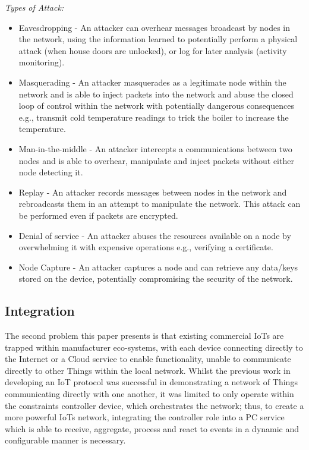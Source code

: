 \documentclass[conference]{./sty/IEEEtran}
\begin{document}
\textit{Types of Attack:}
\begin{itemize}
  \item Eavesdropping - An attacker can overhear messages broadcast by nodes in the network, using the information learned to potentially perform a physical attack (when house doors are unlocked), or log for later analysis (activity monitoring).  
  \item Masquerading - An attacker masquerades as a legitimate node within the network and is able to inject packets into the network and abuse the closed loop of control within the network with potentially dangerous consequences e.g., transmit cold temperature readings to trick the boiler to increase the temperature.
  \item Man-in-the-middle - An attacker intercepts a communications between two nodes and is able to overhear, manipulate and inject packets without either node detecting it. 
  \item Replay - An attacker records messages between nodes in the network and rebroadcasts them in an attempt to manipulate the network. This attack can be performed even if packets are encrypted. 
  \item Denial of service - An attacker abuses the resources available on a node by overwhelming it with expensive operations e.g., verifying a certificate.
  \item Node Capture - An attacker captures a node and can retrieve any data/keys stored on the device, potentially compromising the security of the network.
\end{itemize}

\subsection{Integration} %
\label{sub:integration_aims}
The second problem this paper presents is that existing commercial IoTs are trapped within manufacturer eco-systems, with each device connecting directly to the Internet or a Cloud service to enable functionality, unable to communicate directly to other Things within the local network. Whilst the previous work in developing an IoT protocol was successful in demonstrating a network of Things communicating directly with one another, it was limited to only operate within the constraints controller device, which orchestrates the network; thus, to create a more powerful IoTs network, integrating the controller role into a PC service which is able to receive, aggregate, process and react to events in a dynamic and configurable manner is necessary.
\end{document}
